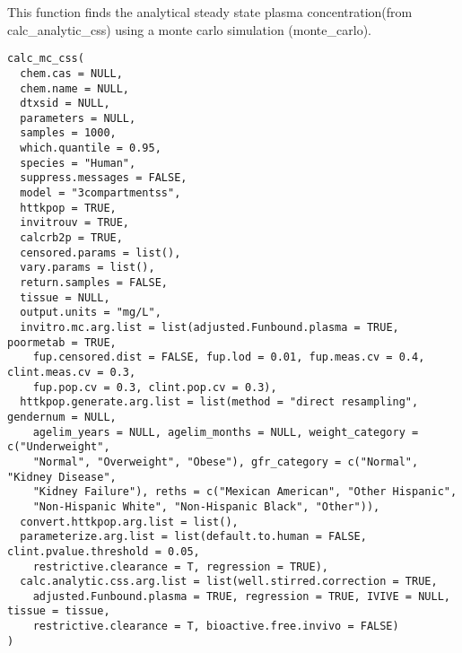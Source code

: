\documentclass[a4paper]{book}
\begin{document}
%
\begin{Description}\relax
This function finds the analytical steady state plasma concentration(from
calc\_analytic\_css) using a monte carlo simulation (monte\_carlo).
\end{Description}
%
\begin{Usage}
\begin{verbatim}
calc_mc_css(
  chem.cas = NULL,
  chem.name = NULL,
  dtxsid = NULL,
  parameters = NULL,
  samples = 1000,
  which.quantile = 0.95,
  species = "Human",
  suppress.messages = FALSE,
  model = "3compartmentss",
  httkpop = TRUE,
  invitrouv = TRUE,
  calcrb2p = TRUE,
  censored.params = list(),
  vary.params = list(),
  return.samples = FALSE,
  tissue = NULL,
  output.units = "mg/L",
  invitro.mc.arg.list = list(adjusted.Funbound.plasma = TRUE, poormetab = TRUE,
    fup.censored.dist = FALSE, fup.lod = 0.01, fup.meas.cv = 0.4, clint.meas.cv = 0.3,
    fup.pop.cv = 0.3, clint.pop.cv = 0.3),
  httkpop.generate.arg.list = list(method = "direct resampling", gendernum = NULL,
    agelim_years = NULL, agelim_months = NULL, weight_category = c("Underweight",
    "Normal", "Overweight", "Obese"), gfr_category = c("Normal", "Kidney Disease",
    "Kidney Failure"), reths = c("Mexican American", "Other Hispanic",
    "Non-Hispanic White", "Non-Hispanic Black", "Other")),
  convert.httkpop.arg.list = list(),
  parameterize.arg.list = list(default.to.human = FALSE, clint.pvalue.threshold = 0.05,
    restrictive.clearance = T, regression = TRUE),
  calc.analytic.css.arg.list = list(well.stirred.correction = TRUE,
    adjusted.Funbound.plasma = TRUE, regression = TRUE, IVIVE = NULL, tissue = tissue,
    restrictive.clearance = T, bioactive.free.invivo = FALSE)
)
\end{verbatim}
\end{Usage}
%
\end{document}
